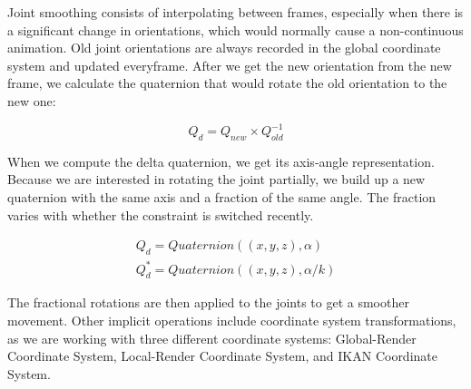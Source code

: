 Joint smoothing consists of interpolating between frames, especially when there is a significant change in orientations, which would normally cause a non-continuous animation. Old joint orientations are always recorded in the global coordinate system and updated everyframe. After we get the new orientation from the new frame, we calculate the quaternion that would rotate the old orientation to the new one:

\begin{equation}
Q_{d} = Q_{new} \times Q_{old}^{-1}
\label{eqn:rotator_quaternion}
\end{equation} 

When we compute the delta quaternion, we get its axis-angle representation. Because we are interested in rotating the joint partially, we build up a new quaternion with the same axis and a fraction of the same angle. The fraction varies with whether the constraint is switched recently. 

\begin{equation} 
\begin{split}
Q_{d} = \textit{Quaternion}((x, y, z), \alpha) \\  
Q_d^* = \textit{Quaternion}((x, y, z), \alpha / k )
\label{eqn:partial_rotator}
\end{split}
\end{equation} 

The fractional rotations are then applied to the joints to get a smoother movement. Other implicit operations include coordinate system transformations, as we are working with three different coordinate systems: Global-Render Coordinate System, Local-Render Coordinate System, and IKAN Coordinate System. 
